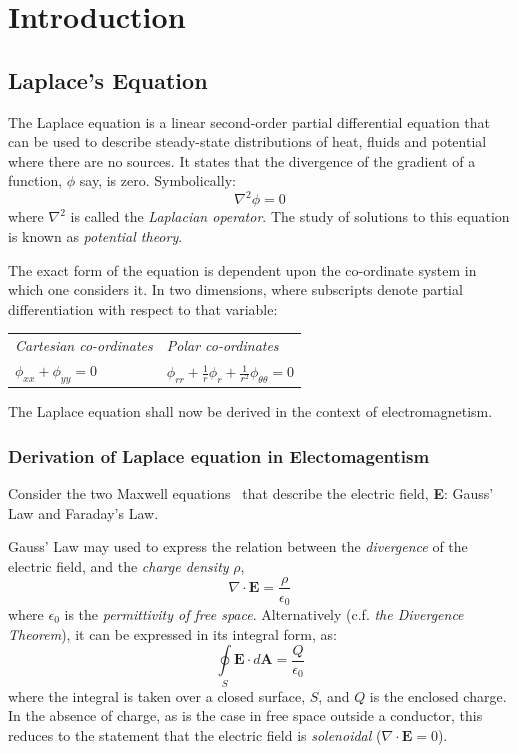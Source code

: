 \documentclass[11pt, a4paper]{article}
\newcommand{\be}{\begin{equation}}
\newcommand{\ee}{\end{equation}}
\begin{document}
\section{Introduction}
\subsection{Laplace's Equation}

The Laplace equation is a linear second-order partial differential equation that can be
used to describe steady-state distributions of heat, fluids and potential where there
are no sources. It states that the divergence of the gradient of a function, $\phi$ say,
is zero. Symbolically:
%
\be
\nabla ^2 \phi = 0
\ee
%
where $\nabla^2$ is called the \emph{Laplacian operator}. The study of solutions to
this equation is known as \emph{potential theory}.

The exact form of the equation is dependent upon the co-ordinate system in which one
considers it. In two dimensions, where subscripts denote partial differentiation with
respect to that variable:

\begin{center}
\begin{tabularx}{0.6\textwidth}{|Y|Y|}
\hline
\emph{Cartesian co-ordinates} & \emph{Polar co-ordinates} \\
$\phi_{xx}+\phi_{yy}=0$ & $\phi_{rr}+\frac{1}{r}\phi_r+\frac{1}{r^2}\phi_{\theta \theta}=0$ \\
\hline
\end{tabularx}
\end{center}

The Laplace equation shall now be derived in the context of electromagnetism.

\subsubsection{Derivation of Laplace equation in Electomagentism}
Consider the two Maxwell equations~\cite{em} that describe the electric field,
\textbf{E}: Gauss' Law and Faraday's Law.

Gauss' Law may used to express the relation between the \emph{divergence} of the
electric field, and the \emph{charge density} $\rho$,
%
\be
\nabla \cdot \bm{E} = \frac{\rho}{\epsilon_0}
\ee
%
where $\epsilon_0$ is the \emph{permittivity of free space}. Alternatively (c.f.
\emph{the Divergence Theorem}), it can be expressed in its integral form, as:
%
\be
\oint \limits_S \bm{E} \cdot d\bm{A} = \frac{Q}{\epsilon_0}
\ee
%
where the integral is taken over a closed surface, $S$, and $Q$ is the enclosed charge.
In the absence of charge, as is the case in free space outside a conductor, this
reduces to the statement that the electric field is \emph{solenoidal}
($\nabla \cdot \bm{E}=0$).
\end{document}
